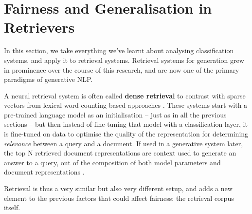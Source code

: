 \part{Fairness and Generalisation in Retrievers}
\label{part:generation}


In this section, we take everything we've learnt about analysing classification systems, and apply it to retrieval systems. 
Retrieval systems for generation grew in prominence over the course of this research, and are now one of the primary paradigms of generative NLP. 

A neural retrieval system is often called \textbf{dense retrieval} to contrast with sparse vectors from lexical word-counting based approaches \citep{BM25}. These systems start with a pre-trained language model as an initialisation -- just as in all the previous sections -- but then instead of fine-tuning that model with a classification layer, it is fine-tuned on data to optimise the quality of the representation for determining \textit{relevance} between a query and a document. If used in a generative system later, the top N retrieved document representations are context used to generate an answer to a query, out of the composition of both model parameters and document representations \citep{lewis2020retrieval, atlas_jmlr}. 

Retrieval is thus a very similar but also very different setup, and adds a new element to the previous factors that could affect fairness: the retrieval corpus itself. 



